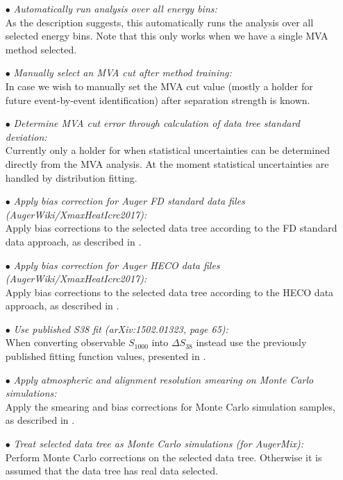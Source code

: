 \documentclass[12pt,a4paper]{report}
\begin{document}
\begin{itemize}
\item[$\bullet$] \emph{Automatically run analysis over all energy bins:}\\As the description suggests, this automatically runs the analysis over all selected energy bins. Note that this only works when we have a single MVA method selected.
\item[$\bullet$] \emph{Manually select an MVA cut after method training:}\\In case we wish to manually set the MVA cut value (mostly a holder for future event-by-event identification) after separation strength is known.
\item[$\bullet$] \emph{Determine MVA cut error through calculation of data tree standard deviation:}\\Currently only a holder for when statistical uncertainties can be determined directly from the MVA analysis. At the moment statistical uncertainties are handled by distribution fitting.
\item[$\bullet$] \emph{Apply bias correction for Auger FD standard data files (AugerWiki/XmaxHeatIcrc2017):}\\Apply bias corrections to the selected data tree according to the FD standard data approach, as described in \cite{CompositionAugerWiki}.
\item[$\bullet$] \emph{Apply bias correction for Auger HECO data files (AugerWiki/XmaxHeatIcrc2017):}\\Apply bias corrections to the selected data tree according to the HECO data approach, as described in \cite{CompositionAugerWiki}.
\item[$\bullet$] \emph{Use published S38 fit (arXiv:1502.01323, page 65):}\\When converting observable $S_{1000}$ into $\Delta S_{38}$ instead use the previously published fitting function values, presented in \cite{paoDesignReport}.
\item[$\bullet$] \emph{Apply atmospheric and alignment resolution smearing on Monte Carlo simulations:}\\Apply the smearing and bias corrections for Monte Carlo simulation samples, as described in \cite{xmaxMoments,xmaxUnger}.
\item[$\bullet$] \emph{Treat selected data tree as Monte Carlo simulations (for AugerMix):}\\Perform Monte Carlo corrections on the selected data tree. Otherwise it is assumed that the data tree has real data selected.
\end{itemize}
\end{document}
